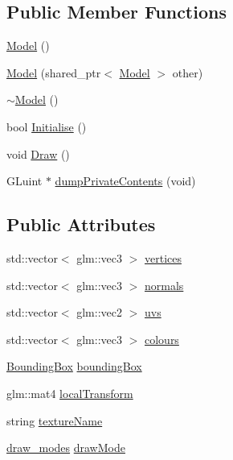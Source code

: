 \subsection*{Public Member Functions}
\begin{DoxyCompactItemize}
\item 
\hyperlink{class_b_g_e_1_1_model_ae3b375de5f6df4faf74a95d64748e048}{Model} ()
\item 
\hyperlink{class_b_g_e_1_1_model_a33f7be5a4c10c97ac935498a816cd9cb}{Model} (shared\-\_\-ptr$<$ \hyperlink{class_b_g_e_1_1_model}{Model} $>$ other)
\item 
\hyperlink{class_b_g_e_1_1_model_ad6ebd2062a0b823db841a0b88baac4c0}{$\sim$\-Model} ()
\item 
bool \hyperlink{class_b_g_e_1_1_model_abaa883a7def8ea1957a211bbf7b4f399}{Initialise} ()
\item 
void \hyperlink{class_b_g_e_1_1_model_a0c668c13fc79a86326f75ea231f3886f}{Draw} ()
\item 
G\-Luint $\ast$ \hyperlink{class_b_g_e_1_1_model_aec27837693fa25f621a79d9534e23536}{dump\-Private\-Contents} (void)
\end{DoxyCompactItemize}
\subsection*{Public Attributes}
\begin{DoxyCompactItemize}
\item 
std\-::vector$<$ glm\-::vec3 $>$ \hyperlink{class_b_g_e_1_1_model_a4cea848aab716e40b9bde28cd922720d}{vertices}
\item 
std\-::vector$<$ glm\-::vec3 $>$ \hyperlink{class_b_g_e_1_1_model_ac2e15ec05b6327a4a93c87d487e51c60}{normals}
\item 
std\-::vector$<$ glm\-::vec2 $>$ \hyperlink{class_b_g_e_1_1_model_ab87b9ba4866781f4db316507f0391e00}{uvs}
\item 
std\-::vector$<$ glm\-::vec3 $>$ \hyperlink{class_b_g_e_1_1_model_a823f2c370081fbc2438da2de700271fd}{colours}
\item 
\hyperlink{struct_b_g_e_1_1_bounding_box}{Bounding\-Box} \hyperlink{class_b_g_e_1_1_model_a44723a79125d28e2cec5d70d4a4363d1}{bounding\-Box}
\item 
glm\-::mat4 \hyperlink{class_b_g_e_1_1_model_acfafbb8464feb0aa8695c9ec53407601}{local\-Transform}
\item 
string \hyperlink{class_b_g_e_1_1_model_acaed7dd09ab85e191e342d96e54793e9}{texture\-Name}
\item 
\hyperlink{class_b_g_e_1_1_model_a0d55ea97da6ffbc3b82c2c1566d13a5e}{draw\-\_\-modes} \hyperlink{class_b_g_e_1_1_model_a7ff9d0fadd85be1fcbd0cd254c3e23ee}{draw\-Mode}
\end{DoxyCompactItemize}


